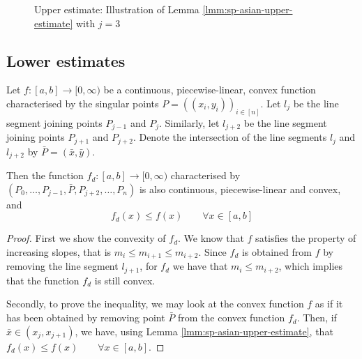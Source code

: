 \begin{figure}
	
	\caption{Upper estimate: Illustration of Lemma \ref{lmm:sp-asian-upper-estimate} with $ j = 3 $}
	\label{fig:upper-estimate}
\end{figure}



\subsection{Lower estimates}
\label{subsec:sp-asian-lower-estimates}

\begin{lmm}
	\label{lmm:sp-asian-lower-estimate}
	Let $ f:[a,b] \to [0, \infty) $ be a continuous, piecewise-linear, convex function characterised by the singular points $ P = ( (x_i, y_i) )_{i \in [n]} $. Let $ l_{j} $ be the line segment joining points $ P_{j-1} $ and $ P_{j} $. Similarly, let $ l_{j+2} $ be the line segment joining points $ P_{j+1} $ and $ P_{j+2} $. Denote the intersection of the line segments $ l_{j} $ and $ l_{j+2} $ by $ \bar{P} = ( \bar{x}, \bar{y} ) $.
	
	Then the function $ f_d: [a,b] \to [0, \infty) $ characterised by $ (P_0, \dots, P_{j-1}, \bar{P}, P_{j+2}, \dots, P_n) $ is also continuous, piecewise-linear and convex, and
	\begin{equation}
		f_d(x) \le f(x) \qquad \forall x \in [a,b]
	\end{equation}
\end{lmm}

\begin{proof}
	First we show the convexity of $f_d$. We know that $f$ satisfies the property of increasing slopes, that is $ m_{i} \le m_{i+1} \le m_{i+2} $. Since $f_d$ is obtained from $f$ by removing the line segment $l_{j+1}$, for $f_d$ we have that $ m_{i} \le m_{i+2} $, which implies that the function $f_d$ is still convex.
	
	Secondly, to prove the inequality, we may look at the convex function $f$ as if it has been obtained by removing point $ \bar{P} $ from the convex function $f_d$. Then, if $ \bar{x} \in ( x_{j} , x_{j+1} ) $, we have, using Lemma \ref{lmm:sp-asian-upper-estimate}, that $ f_d(x) \le f(x) \qquad \forall x \in [a,b] $.
\end{proof}

